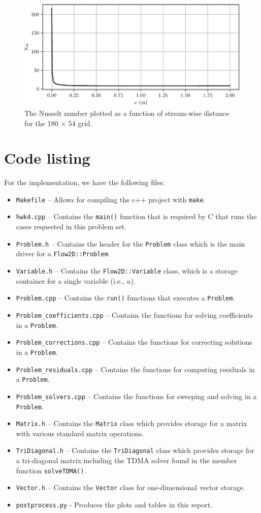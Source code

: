 \documentclass{article}
\begin{document}
\begin{figure}[H]
	\centering
	\includegraphics[width=0.75\linewidth]{../results/Nu}
	\caption{The Nusselt number plotted as a function of stream-wise distance for the 180 $\times$ 54 grid.}
	\label{fig:Nu}
\end{figure}

\section*{Code listing}

For the implementation, we have the following files:
\begin{itemize}
	\item \texttt{Makefile} -- Allows for compiling the c++ project with \texttt{make}.
	\item \texttt{hwk4.cpp} -- Contains the \texttt{main()} function that is required by C that runs the cases requested in this problem set.
	\item \texttt{Problem.h} -- Contains the header for the \texttt{Problem} class which is the main driver for a \texttt{Flow2D::Problem}.
	\item \texttt{Variable.h} -- Contains the \texttt{Flow2D::Variable} class, which is a storage container for a single variable (i.e., $u$).
	\item \texttt{Problem.cpp} -- Contains the \texttt{run()} functions that executes a \texttt{Problem}.
	\item \texttt{Problem\_coefficients.cpp} -- Contains the functions for solving coefficients in a \texttt{Problem}.
	\item \texttt{Problem\_corrections.cpp} -- Contains the functions for correcting solutions in a \texttt{Problem}.
	\item \texttt{Problem\_residuals.cpp} -- Contains the functions for computing residuals in a \texttt{Problem}.
	\item \texttt{Problem\_solvers.cpp} -- Contains the functions for sweeping and solving in a \texttt{Problem}.
	\item \texttt{Matrix.h} -- Contains the \texttt{Matrix} class which provides storage for a matrix with various standard matrix operations.
	\item \texttt{TriDiagonal.h} -- Contains the \texttt{TriDiagonal} class which provides storage for a tri-diagonal matrix including the TDMA solver found in the member function \texttt{solveTDMA()}.
	\item \texttt{Vector.h} -- Contains the \texttt{Vector} class for one-dimensional vector storage.
	\item \texttt{postprocess.py} - Produces the plots and tables in this report.
\end{itemize}
\end{document}
